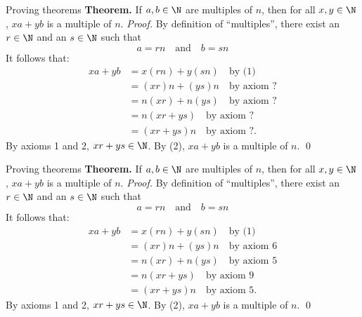 \documentclass[11pt,aspectratio=1610,handout]{beamer}
\begin{document}
\begin{frame}{Proving theorems}
	\textbf{Theorem.} If $a, b \in \N$ are multiples of $n$, then for all $x, y \in \N$, $xa + yb$ is a multiple of $n$. 
	\newline\newline 
	\emph{Proof.} By definition of ``multiples'', there exist an $r \in \N$ and an $s \in \N$ such that 
	\begin{equation}
		a = rn \quad \textrm{and} \quad b = sn
	\end{equation}
	It follows that: 
	\begin{align*}
		xa + yb &= x(rn) + y(sn) \quad \textrm{by (1)} \\
		&= (xr)n + (ys)n \quad \textrm{by axiom ?} \\
		&= n(xr) + n(ys) \quad \textrm{by axiom ?} \\
		&= n(xr + ys) \quad \textrm{by axiom ?} \\
		&= (xr + ys) n \quad \textrm{by axiom ?}. %
	\end{align*}
	By axioms 1 and 2, $xr + ys \in \N$. By (2), $xa + yb$ is a multiple of $n$. \qed
\end{frame}






\begin{frame}{Proving theorems}
	\textbf{Theorem.} If $a, b \in \N$ are multiples of $n$, then for all $x, y \in \N$, $xa + yb$ is a multiple of $n$. 
	\newline\newline 
		\emph{Proof.} By definition of ``multiples'', there exist an $r \in \N$ and an $s \in \N$ such that 
		\begin{equation}
		a = rn \quad \textrm{and} \quad b = sn
		\end{equation}
		It follows that: 
		\begin{align*}
		xa + yb &= x(rn) + y(sn) \quad \textrm{by (1)} \\
		&= (xr)n + (ys)n \quad \textrm{by axiom 6} \\
		&= n(xr) + n(ys) \quad \textrm{by axiom 5} \\
		&= n(xr + ys) \quad \textrm{by axiom 9} \\
		&= (xr + ys) n \quad \textrm{by axiom 5}. %
		\end{align*}
		By axioms 1 and 2, $xr + ys \in \N$. By (2), $xa + yb$ is a multiple of $n$. \qed
\end{frame}
\end{document}
